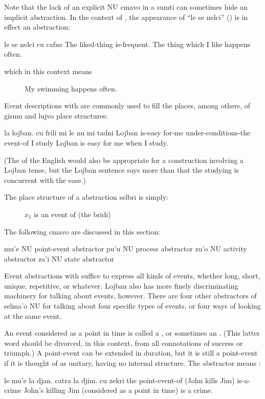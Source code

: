 Note that the lack of an explicit NU cmavo in a sumti can
    sometimes hide an implicit abstraction. In the context of , the appearance of ``le se
    nelci'' () is in effect an
    abstraction:
\begin{example}
le se nelci cu cafne\n
The liked-thing is-frequent.\n
The thing which I like happens often.
\end{example}

{\noindent}which in this context means 
\begin{description}
\item[] My swimming happens often.

\end{description}

Event descriptions with  are commonly used to fill
    the  places, among others, of gismu and
    lujvo place structures:
\begin{example}
la lojban. cu frili mi\n
\T	le nu mi tadni \n
Lojban is-easy for-me\n
\T	under-conditions-the event-of I study\n
Lojban is easy for me when I study.
\end{example}

(The  of the English would also be appropriate for a
    construction involving a Lojban tense, but the Lojban sentence
    says more than that the studying is concurrent with the ease.) 

The place structure of a  abstraction selbri is
    simply:
\begin{description}
\item[] $x_1$ is an event of (the bridi)
\end{description}



The following cmavo are discussed in this section:

   mu'e    NU  point-event abstractor
    pu'u    NU  process abstractor
    zu'o    NU  activity abstractor
    za'i    NU  state abstractor

Event abstractions with  suffice to express all kinds
    of events, whether long, short, unique, repetitive, or
    whatever. Lojban also has more finely discriminating machinery
    for talking about events, however. There are four other
    abstractors of selma'o NU for talking about four specific types
    of events, or four ways of looking at the same event.

An event considered as a point in time is called a
    , or sometimes an . (This latter
    word should be divorced, in this context, from all connotations
    of success or triumph.) A point-event can be extended in
    duration, but it is still a point-event if it is thought of as
    unitary, having no internal structure. The abstractor 
    means :
\begin{example}
le mu'e la djan. catra la djim. cu zekri\n
the point-event-of (John kills Jim) is-a-crime\n
John's killing Jim (considered as a point in time)\n
\T	is a crime.
\end{example}

